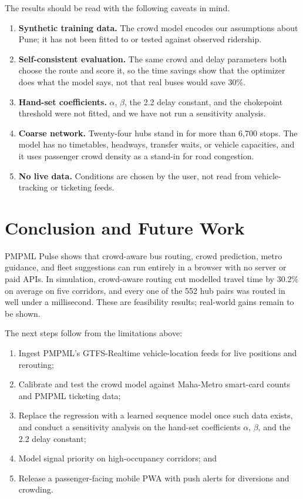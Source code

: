 \documentclass[conference]{IEEEtran}
\begin{document}
The results should be read with the following caveats in mind.
\begin{enumerate}
  \item \textbf{Synthetic training data.} The crowd model encodes our assumptions about Pune; it has not been fitted to or tested against observed ridership.
  \item \textbf{Self-consistent evaluation.} The same crowd and delay parameters both choose the route and score it, so the time savings show that the optimizer does what the model says, not that real buses would save 30\%.
  \item \textbf{Hand-set coefficients.} $\alpha$, $\beta$, the 2.2 delay constant, and the chokepoint threshold were not fitted, and we have not run a sensitivity analysis.
  \item \textbf{Coarse network.} Twenty-four hubs stand in for more than 6,700 stops. The model has no timetables, headways, transfer waits, or vehicle capacities, and it uses passenger crowd density as a stand-in for road congestion.
  \item \textbf{No live data.} Conditions are chosen by the user, not read from vehicle-tracking or ticketing feeds.
\end{enumerate}

\section{Conclusion and Future Work}

PMPML Pulse shows that crowd-aware bus routing, crowd prediction, metro guidance, and fleet suggestions can run entirely in a browser with no server or paid APIs. In simulation, crowd-aware routing cut modelled travel time by 30.2\% on average on five corridors, and every one of the 552 hub pairs was routed in well under a millisecond. These are feasibility results; real-world gains remain to be shown.

The next steps follow from the limitations above:
\begin{enumerate}
  \item Ingest PMPML's GTFS-Realtime vehicle-location feeds for live positions and rerouting;
  \item Calibrate and test the crowd model against Maha-Metro smart-card counts and PMPML ticketing data;
  \item Replace the regression with a learned sequence model once such data exists, and conduct a sensitivity analysis on the hand-set coefficients $\alpha$, $\beta$, and the 2.2 delay constant;
  \item Model signal priority on high-occupancy corridors; and
  \item Release a passenger-facing mobile PWA with push alerts for diversions and crowding.
\end{enumerate}
\end{document}
